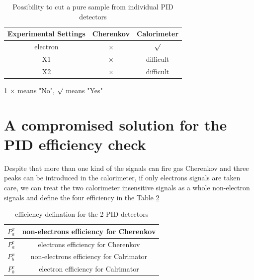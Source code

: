 \begin{table}[!ht]
\large
\centering
 \caption{Possibility to cut a pure sample from individual PID detectors}\label{tab:tablenotes}
\begin{threeparttable}
\begin{tabular}[t]{|c|c|c|}\hline
  Experimental Settings & Cherenkov & Calorimeter  \\ \hline        
  electron          &   $\times$ & $\surd$ \\ \hline
  X1                 &  $\times$  & difficult \\  \hline
 X2                  & $\times$  &   difficult\\  \hline  

 \end{tabular}
\begin{tablenotes}
\centering
        \item[1]  $ \times $ means "No", $ \surd $ means "Yes"
 \end{tablenotes}
\end{threeparttable}
\label{sample1} 
 \end{table}
\section{A compromised solution for the PID efficiency check}
Despite that more than one kind of the signals can fire gas Cherenkov and three peaks can be introduced in the calorimeter, if only electrons signals are taken care, we can treat the two calorimeter insensitive signals as a whole non-electron signals and define the four efficiency  in the Table \ref{eff1} 

\begin{table}[!ht]
\large
\centering
 \caption{efficiency defination for the 2 PID detectors}\label{tab:tablenotes}
\begin{tabular}[t]{|c|c|}\hline
   
  $P_{a}^{x}$          &   non-electrons efficiency for Cherenkov \\ \hline
  $P_{a}^{e}$                  &  electrons efficiency for Cherenkov \\  \hline
  $P_{b}^{x}$                 & non-electrons efficiency for Calrimator \\  \hline  
  $P_{b}^{e}$          &    electron efficiency for Calrimator \\  \hline

 \end{tabular}
 \label{eff1}
 \end{table}

